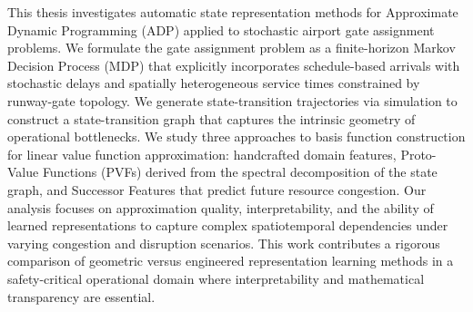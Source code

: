 This thesis investigates automatic state representation methods for Approximate Dynamic Programming (ADP) applied to stochastic airport gate assignment problems. We formulate the gate assignment problem as a finite-horizon Markov Decision Process (MDP) that explicitly incorporates schedule-based arrivals with stochastic delays and spatially heterogeneous service times constrained by runway-gate topology. We generate state-transition trajectories via simulation to construct a state-transition graph that captures the intrinsic geometry of operational bottlenecks. We study three approaches to basis function construction for linear value function approximation: handcrafted domain features, Proto-Value Functions (PVFs) derived from the spectral decomposition of the state graph, and Successor Features that predict future resource congestion. Our analysis focuses on approximation quality, interpretability, and the ability of learned representations to capture complex spatiotemporal dependencies under varying congestion and disruption scenarios. This work contributes a rigorous comparison of geometric versus engineered representation learning methods in a safety-critical operational domain where interpretability and mathematical transparency are essential.